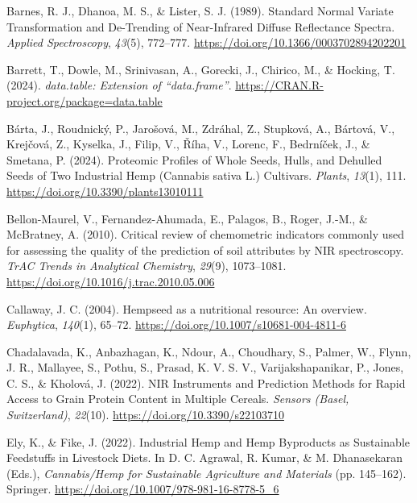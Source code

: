 \documentclass[
]{agujournal2019}
\newlength{\cslhangindent}
\newenvironment{CSLReferences}[2] %
 {\begin{list}{}{%
  \setlength{\itemindent}{0pt}
  \setlength{\leftmargin}{0pt}
  \setlength{\parsep}{0pt}
  \ifodd #1
   \setlength{\leftmargin}{\cslhangindent}
   \setlength{\itemindent}{-1\cslhangindent}
  \fi
  \setlength{\itemsep}{#2\baselineskip}}}
 {\end{list}}
\begin{document}
\label{refs}
\begin{CSLReferences}{1}{0}
Barnes, R. J., Dhanoa, M. S., \& Lister, S. J. (1989). Standard {Normal}
{Variate} {Transformation} and {De}-{Trending} of {Near}-{Infrared}
{Diffuse} {Reflectance} {Spectra}. \emph{Applied Spectroscopy},
\emph{43}(5), 772--777. \url{https://doi.org/10.1366/0003702894202201}

Barrett, T., Dowle, M., Srinivasan, A., Gorecki, J., Chirico, M., \&
Hocking, T. (2024). \emph{{data.table}: Extension of
{``{data.frame}''}}. \url{https://CRAN.R-project.org/package=data.table}

Bárta, J., Roudnický, P., Jarošová, M., Zdráhal, Z., Stupková, A.,
Bártová, V., Krejčová, Z., Kyselka, J., Filip, V., Říha, V., Lorenc, F.,
Bedrníček, J., \& Smetana, P. (2024). Proteomic {Profiles} of {Whole}
{Seeds}, {Hulls}, and {Dehulled} {Seeds} of {Two} {Industrial} {Hemp}
({Cannabis} sativa {L}.) {Cultivars}. \emph{Plants}, \emph{13}(1), 111.
\url{https://doi.org/10.3390/plants13010111}

Bellon-Maurel, V., Fernandez-Ahumada, E., Palagos, B., Roger, J.-M., \&
McBratney, A. (2010). Critical review of chemometric indicators commonly
used for assessing the quality of the prediction of soil attributes by
{NIR} spectroscopy. \emph{TrAC Trends in Analytical Chemistry},
\emph{29}(9), 1073--1081.
\url{https://doi.org/10.1016/j.trac.2010.05.006}

Callaway, J. C. (2004). Hempseed as a nutritional resource: {An}
overview. \emph{Euphytica}, \emph{140}(1), 65--72.
\url{https://doi.org/10.1007/s10681-004-4811-6}

Chadalavada, K., Anbazhagan, K., Ndour, A., Choudhary, S., Palmer, W.,
Flynn, J. R., Mallayee, S., Pothu, S., Prasad, K. V. S. V.,
Varijakshapanikar, P., Jones, C. S., \& Kholová, J. (2022). {NIR}
{Instruments} and {Prediction} {Methods} for {Rapid} {Access} to {Grain}
{Protein} {Content} in {Multiple} {Cereals}. \emph{Sensors (Basel,
Switzerland)}, \emph{22}(10). \url{https://doi.org/10.3390/s22103710}

Ely, K., \& Fike, J. (2022). Industrial {Hemp} and {Hemp} {Byproducts}
as {Sustainable} {Feedstuffs} in {Livestock} {Diets}. In D. C. Agrawal,
R. Kumar, \& M. Dhanasekaran (Eds.), \emph{Cannabis/{Hemp} for
{Sustainable} {Agriculture} and {Materials}} (pp. 145--162). Springer.
\url{https://doi.org/10.1007/978-981-16-8778-5_6}


\end{CSLReferences}
\end{document}
